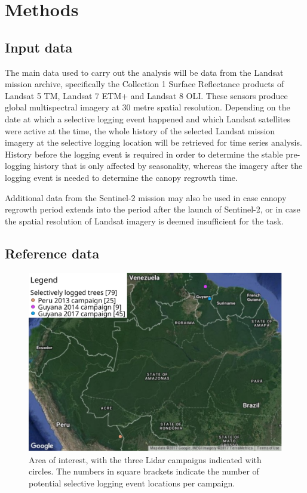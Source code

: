 \documentclass[a4paper,10pt]{article}
\begin{document}
\section{Methods}

\subsection{Input data}

The main data used to carry out the analysis will be data from the Landsat mission archive, specifically the Collection 1 Surface Reflectance products of Landsat 5 \ac{TM}, Landsat 7 \ac{ETM+} and Landsat 8 \ac{OLI}. These sensors produce global multispectral imagery at 30 metre spatial resolution. Depending on the date at which a selective logging event happened and which Landsat satellites were active at the time, the whole history of the selected Landsat mission imagery at the selective logging location will be retrieved for time series analysis. History before the logging event is required in order to determine the stable pre-logging history that is only affected by seasonality, whereas the imagery after the logging event is needed to determine the canopy regrowth time.

Additional data from the Sentinel-2 mission may also be used in case canopy regrowth period extends into the period after the launch of Sentinel-2, or in case the spatial resolution of Landsat imagery is deemed insufficient for the task.

\subsection{Reference data}

\begin{figure}
  \centering
  \includegraphics[width=\textwidth]{proposal-figures/AOI}
  \caption{Area of interest, with the three Lidar campaigns indicated with circles. The numbers in square brackets indicate the number of potential selective logging event locations per campaign.}
  \label{fig-aoi}
\end{figure}
\end{document}
